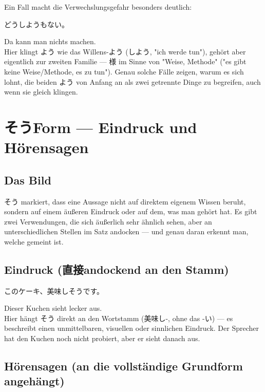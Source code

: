 \documentclass[12pt]{book}
\begin{document}
Ein Fall macht die Verwechslungsgefahr besonders deutlich:

\par\quad どうしようもない。\\
\par\quad Da kann man nichts machen.\\

Hier klingt よう wie das Willens-よう (しよう, "ich werde tun"), gehört aber eigentlich zur zweiten Familie — 様 im Sinne von "Weise, Methode" ("es gibt keine Weise/Methode, es zu tun"). Genau solche Fälle zeigen, warum es sich lohnt, die beiden よう von Anfang an als zwei getrennte Dinge zu begreifen, auch wenn sie gleich klingen.


\chapter{そうForm — Eindruck und Hörensagen}

\section*{Das Bild}

そう markiert, dass eine Aussage nicht auf direktem eigenem Wissen beruht, sondern auf einem äußeren Eindruck oder auf dem, was man gehört hat. Es gibt zwei Verwendungen, die sich äußerlich sehr ähnlich sehen, aber an unterschiedlichen Stellen im Satz andocken — und genau daran erkennt man, welche gemeint ist.

\section*{Eindruck (直接andockend an den Stamm)}

\par\quad このケーキ、美味しそうです。\\
\par\quad Dieser Kuchen sieht lecker aus.\\

Hier hängt そう direkt an den Wortstamm (美味し-, ohne das -い) — es beschreibt einen unmittelbaren, visuellen oder sinnlichen Eindruck. Der Sprecher hat den Kuchen noch nicht probiert, aber er sieht danach aus.

\section*{Hörensagen (an die vollständige Grundform angehängt)}
\end{document}
